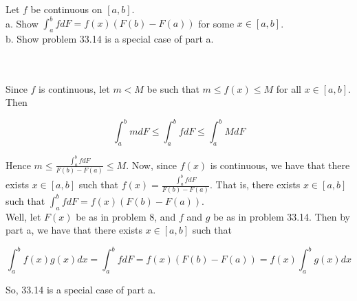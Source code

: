 Let $f$ be continuous on $[a,b]$.\\

a. Show $\int_a^bfdF=f(x)(F(b)-F(a))$ for some $x\in[a,b]$.\\

b. Show problem 33.14 is a special case of part a.\\\\

\begin{solution}\renewcommand{\qedsymbol}{}\ \\
    Since $f$ is continuous, let $m<M$ be such that $m\leq f(x)\leq M$ for all $x\in[a,b]$. Then
    
    $$\int_a^bmdF\leq\int_a^bfdF\leq\int_a^bMdF$$
    
    Hence $m\leq\frac{\int_a^bfdF}{F(b)-F(a)}\leq M$. Now, since $f(x)$ is continuous, we have that
    there exists $x\in[a,b]$ such that $f(x)=\frac{\int_a^bfdF}{F(b)-F(a)}$. That is, there exists
    $x\in[a,b]$ such that $\int_a^bfdF=f(x)(F(b)-F(a))$.\\

    Well, let $F(x)$ be as in problem 8, and $f$ and $g$ be as in problem 33.14. Then by part a, we have
    that there exists $x\in[a,b]$ such that
    
    $$\int_a^bf(x)g(x)dx=\int_a^bfdF=f(x)(F(b)-F(a))=f(x)\int_a^bg(x)dx$$
    
    So, 33.14 is a special case of part a.

\end{solution}